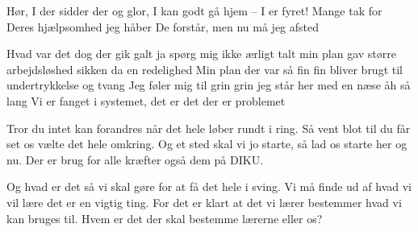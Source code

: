 \documentclass[a4paper,11pt]{article}
\begin{document}
\begin{song}
Hør, I der sidder der og glor,
I kan godt gå hjem --
I er fyret!
Mange tak for Deres hjælpsomhed
jeg håber De forstår, men nu må jeg afsted

Hvad var det dog der gik galt
ja spørg mig ikke ærligt talt
min plan gav større arbejdsløshed
sikken da en redelighed
Min plan der var så fin fin
bliver brugt til undertrykkelse og tvang
Jeg føler mig til grin grin
jeg står her med en næse åh så lang
Vi er fanget i systemet,
det er det der er problemet

Tror du intet kan forandres
når det hele løber rundt i ring.
Så vent blot til du får set os
vælte det hele omkring.
Og et sted skal vi jo starte,
så lad os starte her og nu.
Der er brug for alle kræfter
også dem på DIKU.

Og hvad er det så vi skal gøre
for at få det hele i sving.
Vi må finde ud af hvad vi vil lære
det er en vigtig ting.
For det er klart at det vi lærer
bestemmer hvad vi kan bruges til.
Hvem er det der skal bestemme
lærerne eller os?
\end{song}
\end{document}
